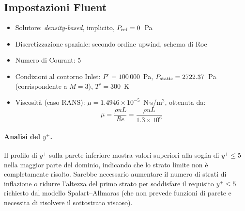 \subsection{Impostazioni Fluent}

\begin{itemize}
  \item Solutore: \textit{density-based}, implicito, $P_{\rm ref} = 0$~Pa
  \item Discretizzazione spaziale: secondo ordine upwind, schema di Roe
  \item Numero di Courant: 5
  \item Condizioni al contorno Inlet: $P^\circ = 100\,000$~Pa,
    $P_{\rm static} = 2722.37$~Pa (corrispondente a $M = 3$), $T^\circ = 300$~K
  \item Viscosità (caso RANS): $\mu = 1.4946 \times 10^{-5}$~N$\cdot$s/m$^2$,
    ottenuta da:
    \begin{equation}
      \mu = \frac{\rho u L}{Re} = \frac{\rho u L}{1.3 \times 10^6}
    \end{equation}
\end{itemize}

\paragraph{Analisi del $y^+$.}
Il profilo di $y^+$ sulla parete inferiore mostra valori superiori alla soglia di $y^+ \le 5$
nella maggior parte del dominio, indicando che lo strato limite non è completamente risolto.
Sarebbe necessario aumentare il numero di strati di inflazione o ridurre l'altezza del primo
strato per soddisfare il requisito $y^+ \le 5$ richiesto dal modello Spalart--Allmaras
(che non prevede funzioni di parete e necessita di risolvere il sottostrato viscoso).
